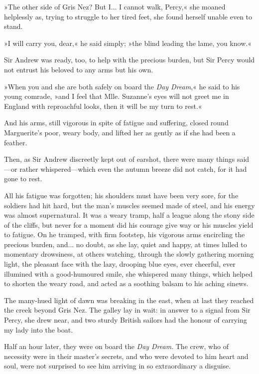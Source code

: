 »The other side of Gris Nez? But I... I cannot walk, Percy,« she moaned helplessly as, trying to struggle to her tired feet, she found herself unable even to stand.

»I will carry you, dear,« he said simply; »the blind leading the lame, you know.«

Sir Andrew was ready, too, to help with the precious burden, but Sir Percy would not entrust his beloved to any arms but his own.

»When you and she are both safely on board the \textit{Day Dream},« he said to his young comrade, »and I feel that Mlle. Suzanne's eyes will not greet me in England with reproachful looks, then it will be my turn to rest.«

And his arms, still vigorous in spite of fatigue and suffering, closed round Marguerite's poor, weary body, and lifted her as gently as if she had been a feather.

Then, as Sir Andrew discreetly kept out of earshot, there were many things said\allowbreak---\allowbreak or rather whispered\allowbreak---\allowbreak which even the autumn breeze did not catch, for it had gone to rest.

All his fatigue was forgotten; his shoulders must have been very sore, for the soldiers had hit hard, but the man's muscles seemed made of steel, and his energy was almost supernatural. It was a weary tramp, half a league along the stony side of the cliffs, but never for a moment did his courage give way or his muscles yield to fatigue. On he tramped, with firm footstep, his vigorous arms encircling the precious burden, and... no doubt, as she lay, quiet and happy, at times lulled to momentary drowsiness, at others watching, through the slowly gathering morning light, the pleasant face with the lazy, drooping blue eyes, ever cheerful, ever illumined with a good-humoured smile, she whispered many things, which helped to shorten the weary road, and acted as a soothing balsam to his aching sinews.

The many-hued light of dawn was breaking in the east, when at last they reached the creek beyond Gris Nez. The galley lay in wait: in answer to a signal from Sir Percy, she drew near, and two sturdy British sailors had the honour of carrying my lady into the boat.

Half an hour later, they were on board the \textit{Day Dream}. The crew, who of necessity were in their master's secrets, and who were devoted to him heart and soul, were not surprised to see him arriving in so extraordinary a disguise.

